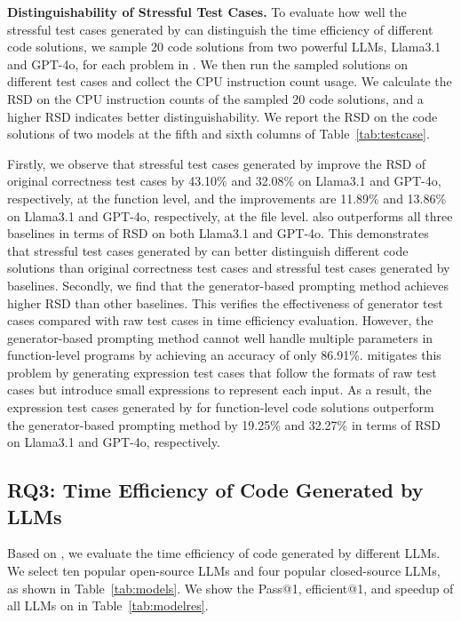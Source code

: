 \textbf{Distinguishability of Stressful Test Cases.} To evaluate how well the stressful test cases generated by \tool can distinguish the time efficiency of different code solutions, we sample 20 code solutions from two powerful LLMs, Llama3.1 and GPT-4o, for each problem in \bench. We then run the sampled solutions on different test cases and collect the CPU instruction count usage. We calculate the RSD on the CPU instruction counts of the sampled 20 code solutions, and a higher RSD indicates better distinguishability. We report the RSD on the code solutions of two models at the fifth and sixth columns of Table~\ref{tab:testcase}.  

Firstly, we observe that stressful test cases generated by \tool improve the RSD of original correctness test cases by 43.10\% and 32.08\% on Llama3.1 and GPT-4o, respectively, at the function level, and the improvements are 11.89\% and 13.86\% on Llama3.1 and GPT-4o, respectively, at the file level. \tool also outperforms all three baselines in terms of RSD on both Llama3.1 and GPT-4o. This demonstrates that stressful test cases generated by \tool can better distinguish different code solutions than original correctness test cases and stressful test cases generated by baselines. Secondly, we find that the generator-based prompting method achieves higher RSD than other baselines. This verifies the effectiveness of generator test cases compared with raw test cases in time efficiency evaluation. However, the generator-based prompting method cannot well handle multiple parameters in function-level programs by achieving an accuracy of only 86.91\%. \tool mitigates this problem by generating expression test cases that follow the formats of raw test cases but introduce small expressions to represent each input. As a result, the expression test cases generated by \tool for function-level code solutions outperform the generator-based prompting method by 19.25\% and 32.27\% in terms of RSD on Llama3.1 and GPT-4o, respectively.

 




\subsection{RQ3: Time Efficiency of Code Generated by LLMs}
Based on \bench, we evaluate the time efficiency of code generated by different LLMs. We select ten popular open-source LLMs and four popular closed-source LLMs, as shown in Table~\ref{tab:models}. We show the Pass@1, efficient@1, and speedup of all LLMs on \bench in Table~\ref{tab:modelres}.

